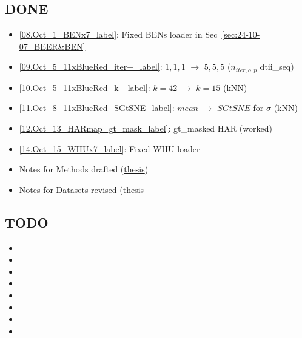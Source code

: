 

\begin{multicols}{2}
\subsection*{DONE}
\begin{itemize}
    \item \ref{08.Oct_1_BENx7_label}: Fixed BENs loader in Sec~\ref{sec:24-10-07_BEER&BEN}
    \item \ref{09.Oct_5_11xBlueRed_iter+_label}: $1,1,1$ $\rightarrow$ $5,5,5$ ($n_{iter, o, p}$ dtii\_seq)
    \item \ref{10.Oct_5_11xBlueRed_k-_label}: $k=42$ $\rightarrow$ $k=15$ (kNN)
    \item \ref{11.Oct_8_11xBlueRed_SGtSNE_label}: $mean$ $\rightarrow$ $SGtSNE$ for $\sigma$ (kNN)
    \item \ref{12.Oct_13_HARmap_gt_mask_label}: gt\_masked HAR (worked)
    \item \ref{14.Oct_15_WHUx7_label}: Fixed WHU loader
    \item Notes for Methods drafted (\href{https://gitlab.oit.duke.edu/jw853/clustering4hsi_thesis}{thesis})
    \item Notes for Datasets revised (\href{https://gitlab.oit.duke.edu/jw853/clustering4hsi_thesis}{thesis}
\end{itemize}

\subsection*{TODO}
\begin{itemize}
    \item {}
    \item 
    \item 
    \item 
    \item 
    \item 
    \item 
    \item 
\end{itemize}
\end{multicols}

\newpage

